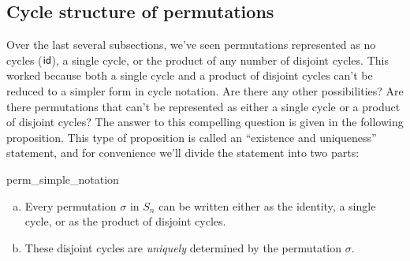 %

\subsection{Cycle structure of permutations}
\label{subsec:Permutations:CycleNotation:CycleStructure}

Over the last several subsections, we've seen permutations represented as no cycles (${\sf{i}d}$), a single cycle, or the product of any number of disjoint cycles.  This worked because both a single cycle and a product of disjoint cycles can't be reduced to a simpler form in cycle notation.  Are there any other possibilities?   Are there permutations that can't be represented as either a single cycle or a product of disjoint cycles?  The answer to this compelling question is given in the following proposition. This type of proposition is called an ``existence and uniqueness'' statement, and for convenience we'll divide the statement into two parts:


\begin{prop}{perm_simple_notation}
\begin{enumerate}[(a)]
\item    
Every permutation $\sigma$ in  $S_n$ can be written either as the identity, a  single cycle, or as the product of disjoint cycles. 
\item
These  disjoint cycles are \emph{uniquely} determined by the permutation $\sigma$.
\end{enumerate}
\end{prop}

